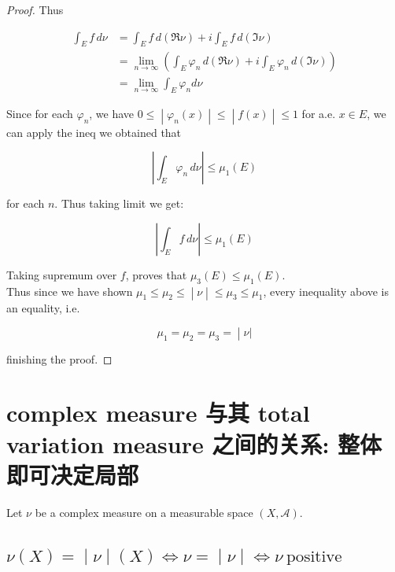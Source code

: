\begin{proof}
Thus

\[\begin{matrix}
{\int_{E}f\, d\nu} & {= \int_{E}f\, d(\Re\nu) + i\int_{E}f\, d(\Im\nu)} \\
 & {= \lim\limits_{n\rightarrow\infty}(\int_{E}\varphi_{n}\, d(\Re\nu) + i\int_{E}\varphi_{n}\, d(\Im\nu))} \\
 & {= \lim\limits_{n\rightarrow\infty}\int_{E}\varphi_{n}d\nu}
\end{matrix}\]

Since for each \(\varphi_{n}\), we have \(\left. 0 \leq \middle| \varphi_{n}(x) \middle| \leq \middle| f(x) \middle| \leq 1 \right.\) for a.e. \(x \in E\), we can apply the ineq we obtained that

\[\left| {\int_{E}\varphi_{n}\, d\nu} \right| \leq \mu_{1}(E)\]

for each \(n\). Thus taking limit we get:

\[\left| {\int_{E}f\, d\nu} \right| \leq \mu_{1}(E)\]

Taking supremum over \(f\), proves that \(\mu_{3}(E) \leq \mu_{1}(E)\).\\
Thus since we have shown \(\left. \mu_{1} \leq \mu_{2} \leq \middle| \nu \middle| \leq \mu_{3} \leq \mu_{1} \right.\), every inequality above is an equality, i.e.

\[\left. \mu_{1} = \mu_{2} = \mu_{3} = \middle| \nu| \right.\]

finishing the proof.

\end{proof}

\section{complex measure 与其 total variation measure 之间的关系: 整体即可决定局部}\label{complex-measure-ux4e0eux5176-total-variation-measure-ux4e4bux95f4ux7684ux5173ux7cfb-ux6574ux4f53ux5373ux53efux51b3ux5b9aux5c40ux90e8}

Let \(\nu\) be a complex measure on a measurable space \((X,\mathcal{A})\).

\subsection{\texorpdfstring{\(\left. \nu(X) = \middle| \nu \middle| (X)\Leftrightarrow\nu = \middle| \nu \middle| \Leftrightarrow\nu\ \text{positive} \right.\)}{\textbackslash left. \textbackslash nu(X) = \textbackslash middle\textbar{} \textbackslash nu \textbackslash middle\textbar{} (X)\textbackslash Leftrightarrow\textbackslash nu = \textbackslash middle\textbar{} \textbackslash nu \textbackslash middle\textbar{} \textbackslash Leftrightarrow\textbackslash nu\textbackslash{} \textbackslash text\{positive\} \textbackslash right.}}

